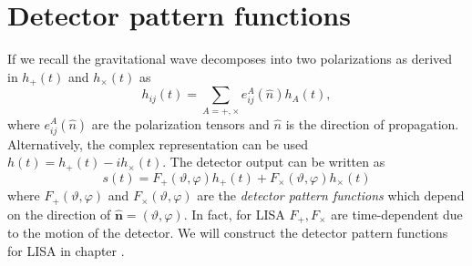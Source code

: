 \section{Detector pattern functions}
If we recall the gravitational wave decomposes into two polarizations as derived in  $h_+(t)$ and $h_\times(t)$ as
\begin{equation}
    \label{eq:gw-polarizations}
    h_{ij}(t) = \sum_{A = +, \times} e^A_{ij}(\hat{n}) h_A(t),
\end{equation}
where $e^A_{ij}(\hat{n})$ are the polarization tensors and $\hat{n}$ is the direction of propagation. Alternatively, the complex representation can be used $h(t) = h_+(t) -i h_\times(t)$. The detector output can be written as
\begin{equation}
    \label{eq:detector-output-polarizations}
    s(t) = F_+(\vartheta, \varphi) h_+(t) + F_\times(\vartheta, \varphi) h_\times(t)
\end{equation}
where $F_+(\vartheta, \varphi)$ and $F_\times(\vartheta, \varphi)$ are the \emph{detector pattern functions} which depend on the direction of $\hat{\bm{n}} = (\vartheta, \varphi)
$. In fact, for LISA $F_+, F_\times$ are time-dependent due to the motion of the detector. We will construct the detector pattern functions for LISA in chapter .

